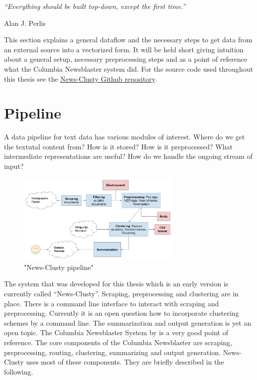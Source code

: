 \epigraph{\emph{
  ``Everything should be built top-down, except the first time.''
}}{ Alan J. Perlis }
 
This section explains a general dataflow and the necessary steps to get data from an external source into a vectorized form. It will be held short giving intuition about a general setup, necessary preprocessing steps and as a point of reference what the Columbia Newsblaster system did. For the source code used throughout this thesis see the \href{https://github.com/sacry-/text-mining-haw-bachelor/}{News-Clusty Github repository}.

\section{Pipeline}
\label{sec:pipeline}
  
  A data pipeline for text data has various modules of interest. Where do we get the textutal content from? How is it stored? How is it preprocessed? What intermediate representations are useful? How do we handle the ongoing stream of input?

  \begin{figure}[h!]
    \centering
      \includegraphics[width=0.7\textwidth]{news_clusty.png}
      \caption{"News-Clusty pipeline"}
      \label{news_clusty}
  \end{figure}

  The system that was developed for this thesis which is an early version is currently called ``News-Clusty''. Scraping, preprocessing and clustering are in place. There is a command line interface to interact with scraping and preprocessing. Currently it is an open question how to incorporate clustering schemes by a command line. The summarization and output generation is yet an open topic. The Columbia Newsblaster System by \cite{ColumbiaMultiDoc2001} is a very good point of reference. The core components of the Columbia Newsblaster are scraping, preprocessing, routing, clustering, summarizing and output generation. News-Clusty uses most of these components. They are briefly described in the following.

